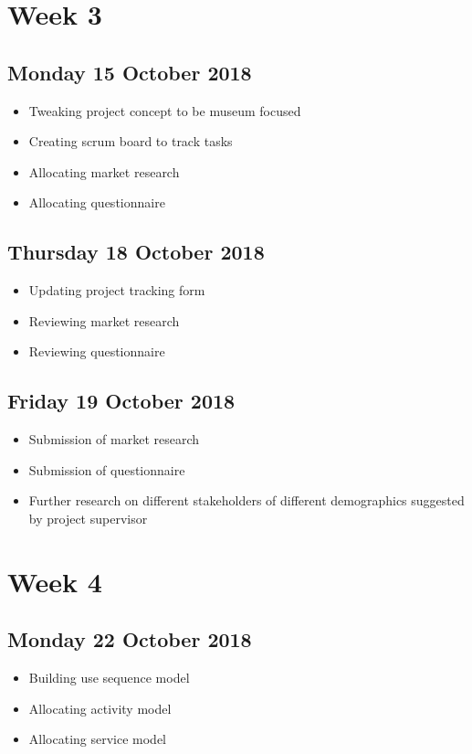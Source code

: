 \section*{Week 3}
\subsection*{Monday 15 October 2018}
\begin{itemize}
	\item Tweaking project concept to be museum focused 
	\item Creating scrum board to track tasks
	\item Allocating market research
	\item Allocating questionnaire
\end{itemize}

\subsection*{Thursday 18 October 2018}
\begin{itemize}
	\item Updating project tracking form
	\item Reviewing market research
	\item Reviewing questionnaire
\end{itemize}

\subsection*{Friday 19 October 2018}
\begin{itemize}
	\item Submission of market research
	\item Submission of questionnaire
	\item Further research on different stakeholders of different demographics suggested by project supervisor
\end{itemize}

\section*{Week 4}
\subsection*{Monday 22 October 2018}
\begin{itemize}
	\item Building use sequence model
	\item Allocating activity model
	\item Allocating service model
\end{itemize}

